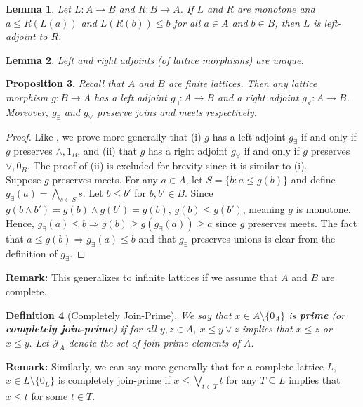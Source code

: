 \documentclass{article}
\newtheorem{proposition}{Proposition}[section]
\newtheorem{lemma}[proposition]{Lemma}
\newtheorem{definition}[proposition]{Definition}
\newcommand{\meet}{\wedge}
\newcommand{\join}{\vee}
\newcommand{\bigmeet}{\bigwedge}
\newcommand{\bigjoin}{\bigvee}
\begin{document}
\begin{lemma}
Let $L : A \to B$ and $R : B \to A$. If $L$ and $R$ are monotone and $a \leq R(L(a))$ and $L(R(b)) \leq b$ for all $a \in A$ and $b \in B$, then $L$ is left-adjoint to $R$.
\end{lemma}

\begin{lemma}
Left and right adjoints (of lattice morphisms) are unique.
\end{lemma}

\begin{proposition}
Recall that $A$ and $B$ are finite lattices. Then any lattice morphism $g : B \to A$ has a left adjoint $g_\exists : A \to B$ and a right adjoint $g_\forall : A \to B$. Moreover, $g_\exists$ and $g_\forall$ preserve joins and meets respectively.
\end{proposition}

\begin{proof}
Like , we prove more generally that (i) $g$ has a left adjoint $g_\exists$ if and only if $g$ preserves $\meet, 1_B$, and (ii) that $g$ has a right adjoint $g_\forall$ if and only if $g$ preserves $\join, 0_B$. The proof of (ii) is excluded for brevity since it is similar to (i). \\

Suppose $g$ preserves meets. For any $a \in A$, let $S = \{b : a \leq g(b)\}$ and define $g_\exists(a) = \bigmeet_{s \in S}s$. Let $b \leq b'$ for $b, b' \in B$. Since $g(b \meet b') = g(b) \meet g(b') = g(b)$, $g(b) \leq g(b')$, meaning $g$ is monotone. Hence, $g_\exists(a) \leq b \Rightarrow g(b) \geq g(g_\exists(a)) \geq a$ since $g$ preserves meets. The fact that $a \leq g(b) \Rightarrow g_\exists(a) \leq b$ and that $g_\exists$ preserves unions is clear from the definition of $g_\exists$.
\end{proof}

\textbf{Remark:} This generalizes to infinite lattices if we assume that $A$ and $B$ are complete.

\begin{definition}[Completely Join-Prime]
We say that $x \in A \setminus \{0_A\}$ is \textbf{prime} (or \textbf{completely join-prime}) if for all $y, z \in A$, $x \leq y \join z$ implies that $x \leq z$ or $x \leq y.$ Let $\mathcal{J}_A$ denote the set of join-prime elements of $A$. 
\end{definition}

\textbf{Remark:} Similarly, we can say more generally that for a complete lattice $L,$ $x \in L \setminus \{0_L\}$ is completely join-prime if $x \leq \bigjoin_{t \in T} t$ for any $T \subseteq L$ implies that $x \leq t$ for some $t \in T.$
\end{document}
